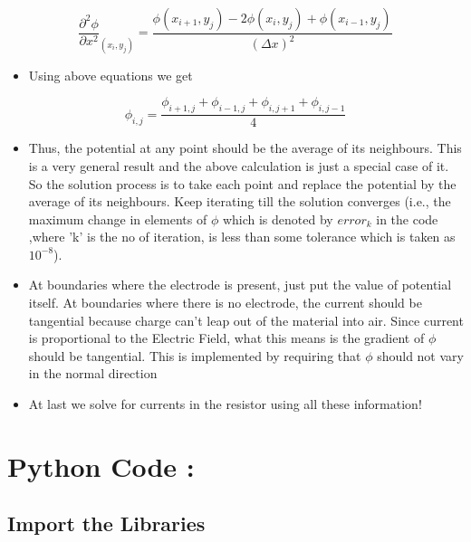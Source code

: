 \documentclass[a4paper,10pt]{article}
\providecommand{\tightlist}{%
      \setlength{\itemsep}{0pt}\setlength{\parskip}{0pt}}
\begin{document}
\begin{equation}
\frac{\partial^{2} \phi}{\partial x^{2}}_{(x_i,y_j)} = \frac{\phi(x_{i+1},y_j) -2\phi(x_i,y_j)+ \phi(x_{i-1},y_j)}{(\Delta x)^{2}}
 \end{equation}

\begin{itemize}
\tightlist
\item
  Using above equations we get
\end{itemize}

\begin{equation}
        \phi_{i,j} = \frac{\phi_{i+1,j} + \phi_{i-1,j} + \phi_{i,j+1} + \phi_{i,j-1}}{4} 
\end{equation}

\begin{itemize}
\tightlist
\item
  Thus, the potential at any point should be the average of its
  neighbours. This is a very general result and the above calculation is
  just a special case of it. So the solution process is to take each
  point and replace the potential by the average of its neighbours. Keep
  iterating till the solution converges (i.e., the maximum change in
  elements of \(\phi\) which is denoted by \(error_k\) in the code
  ,where 'k' is the no of iteration, is less than some tolerance which
  is taken as \(10^{-8}\)).
\item
  At boundaries where the electrode is present, just put the value of
  potential itself. At boundaries where there is no electrode, the
  current should be tangential because charge can't leap out of the
  material into air. Since current is proportional to the Electric
  Field, what this means is the gradient of \(\phi\) should be
  tangential. This is implemented by requiring that \(\phi\) should not
  vary in the normal direction
\item
  At last we solve for currents in the resistor using all these
  information!
\end{itemize}

    \section{Python Code :}\label{python-code}

\subsection{Import the Libraries}\label{import-the-libraries}
\end{document}
